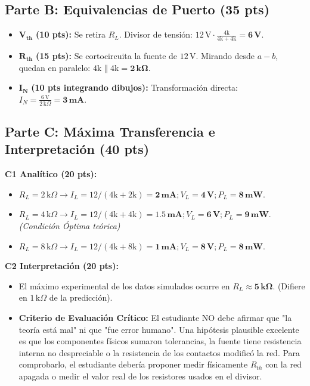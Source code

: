 \documentclass[11pt, a4paper]{article}
\begin{document}
\subsection*{Parte B: Equivalencias de Puerto (35 pts)}
\begin{itemize}
    \item $\mathbf{V_{th}}$ \textbf{(10 pts):} Se retira $R_L$. Divisor de tensión: $12\,\text{V} \cdot \frac{4\text{k}}{4\text{k}+4\text{k}} = \mathbf{6\,\text{V}}$.
    \item $\mathbf{R_{th}}$ \textbf{(15 pts):} Se cortocircuita la fuente de $12\,\text{V}$. Mirando desde $a-b$, quedan en paralelo: $4\text{k} \parallel 4\text{k} = \mathbf{2\,\text{k}\Omega}$.
    \item $\mathbf{I_{N}}$ \textbf{(10 pts integrando dibujos):} Transformación directa: $I_N = \frac{6\,\text{V}}{2\,\text{k}\Omega} = \mathbf{3\,\text{mA}}$.
\end{itemize}

\subsection*{Parte C: Máxima Transferencia e Interpretación (40 pts)}
\textbf{C1 Analítico (20 pts):}
\begin{itemize}
    \item $R_L = 2\,\text{k}\Omega \rightarrow I_L = 12/(4\text{k}+2\text{k}) = \mathbf{2\,\text{mA}}; V_L = \mathbf{4\,\text{V}}; P_L = \mathbf{8\,\text{mW}}$.
    \item $R_L = 4\,\text{k}\Omega \rightarrow I_L = 12/(4\text{k}+4\text{k}) = \mathbf{1.5\,\text{mA}}; V_L = \mathbf{6\,\text{V}}; P_L = \mathbf{9\,\text{mW}}$. \textit{(Condición Óptima teórica)}
    \item $R_L = 8\,\text{k}\Omega \rightarrow I_L = 12/(4\text{k}+8\text{k}) = \mathbf{1\,\text{mA}}; V_L = \mathbf{8\,\text{V}}; P_L = \mathbf{8\,\text{mW}}$.
\end{itemize}

\textbf{C2 Interpretación (20 pts):}
\begin{itemize}
    \item El máximo experimental de los datos simulados ocurre en $R_L \approx \mathbf{5\,\text{k}\Omega}$. (Difiere en $1\,\text{k}\Omega$ de la predicción).
    \item \textbf{Criterio de Evaluación Crítico:} El estudiante NO debe afirmar que "la teoría está mal" ni que "fue error humano". Una hipótesis plausible excelente es que los componentes físicos sumaron tolerancias, la fuente tiene resistencia interna no despreciable o la resistencia de los contactos modificó la red. Para comprobarlo, el estudiante debería proponer medir físicamente $R_{th}$ con la red apagada o medir el valor real de los resistores usados en el divisor.
\end{itemize}
\end{document}
